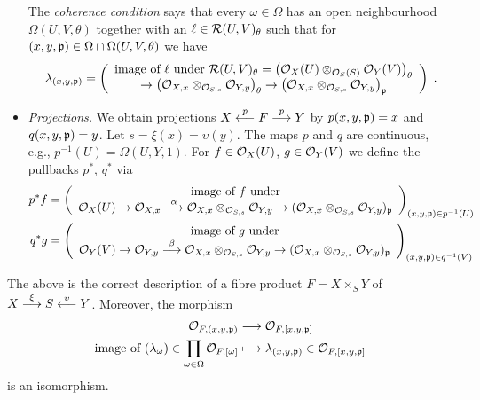 \documentclass[a4paper,parskip=half,numbers=enddot, DIV=12]{scrreprt}
\begin{document}
\begin{itemize}
	The \emph{coherence condition} says that every $\omega\in\Omega$ has an open neighbourhood $\Omega(U,V,\theta)$ together with an $\ell\in\mathcal{R}(U,V)_{\theta}$ such that for $(x,y,\mathfrak{p})\in\Omega\cap\Omega(U,V,\theta)$ we have
	\begin{align*}
		\lambda_{(x,y,\pp)}=\left(
		\begin{array}{c}
			\text{image of }\ell\text{ under }\Rr(U,V)_\theta=\left(\Oo_X(U)\otimes_{\Oo_S(S)}\Oo_Y(V)\right)_\theta\\
			\morphism\left(\Oo_{X,x}\otimes_{\Oo_{S,s}}\Oo_{Y,y}\right)_\theta\morphism\left(\Oo_{X,x}\otimes_{\Oo_{S,s}}\Oo_{Y,y}\right)_\pp
		\end{array}\right)\;.
	\end{align*}
	\item \emph{Projections.} We obtain projections $X\lmorphism[p]F\morphism[p] Y$ by $p(x,y,\mathfrak{p}) = x$ and $q(x,y,\mathfrak{p}) = y$. Let $s=\xi(x)=\upsilon(y)$. The maps $p$ and $q$ are continuous, e.g., $p^{-1}(U)=\Omega(U,Y,1)$. For $f\in\mathcal{O}_X(U)$, $g\in \mathcal{O}_Y(V)$ we define the pullbacks $p^*$, $q^*$ via
	\begin{align*}
        p^*f&= \left(
        \begin{array}{c}
	        \text{image of } f\text{ under}\\
	         \Oo_X(U) \morphism\Oo_{X,x} \morphism[\alpha] \Oo_{X,x}\otimes_{\Oo_{S,s}}\Oo_{Y,y} \morphism (\Oo_{X,x}\otimes_{\Oo_{S,s}}\Oo_{Y,y})_\pp
        \end{array}\right)_{(x,y,\pp) \in p^{-1}(U)}\\
        q^*g&=  \left(
        \begin{array}{c}
	        \text{image of } g\text{ under}\\
	         \Oo_Y(V) \morphism\Oo_{Y,y} \morphism[\beta] \Oo_{X,x}\otimes_{\Oo_{S,s}}\Oo_{Y,y} \morphism (\Oo_{X,x}\otimes_{\Oo_{S,s}}\Oo_{Y,y})_\pp
	         \end{array}\right)_{(x,y,\pp) \in q^{-1}(V)}
	\end{align*}
\end{itemize}
\begin{prop}
    The above is the correct description of a fibre product $F=X\times_SY$ of $X\morphism[\xi]S\lmorphism[\upsilon]Y$. Moreover, the morphism
    \begin{align*}
        \Oo_{F,(x,y,\pp)} &\morphism \Oo_{F,[x,y,\pp]}\\
        \text{image of }(\lambda_\omega)\in\prod_{\omega\in\Omega}\Oo_{F,[\omega]}&\longmapsto\lambda_{(x,y,\pp)}\in\Oo_{F,[x,y,\pp]}
    \end{align*}
    is an isomorphism.
\end{prop}
\end{document}
